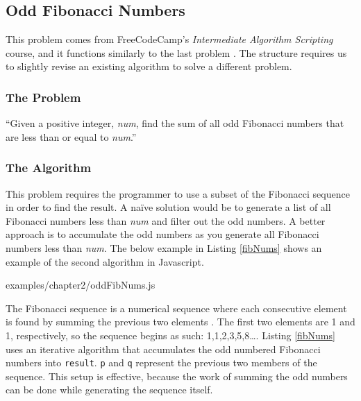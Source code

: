 \documentclass[12pt, oneside, a4paper]{book}
\begin{document}
         \subsection{Odd Fibonacci Numbers}
         This problem comes from FreeCodeCamp's \textit{Intermediate Algorithm Scripting} course, and it functions similarly to the last problem \autocite{freecodecampLearnIntermediateAlgorithm}.
         The structure requires us to slightly revise an existing algorithm to solve a different problem.

         \subsubsection{The Problem}
         ``Given a positive integer, \textit{num}, find the sum of all odd Fibonacci numbers that are less than or equal to \textit{num}.''

         \subsubsection{The Algorithm}
         This problem requires the programmer to use a subset of the Fibonacci sequence in order to find the result.
         A naïve solution would be to generate a list of all Fibonacci numbers less than \textit{num} and filter out the odd numbers.
         A better approach is to accumulate the odd numbers as you generate all Fibonacci numbers less than \textit{num}.
         The below example in Listing \ref{fibNums} shows an example of the second algorithm in Javascript.

         
         {examples/chapter2/oddFibNums.js}

         The Fibonacci sequence is a numerical sequence where each consecutive element is found by summing the previous two elements \autocite{parshallFibonacciSequence}.
         The first two elements are 1 and 1, respectively, so the sequence begins as such: 1,1,2,3,5,8\ldots.
         Listing \ref{fibNums} uses an iterative algorithm that accumulates the odd numbered Fibonacci numbers into \lstinline!result!.
         \lstinline!p! and \lstinline!q! represent the previous two members of the sequence.
         This setup is effective, because the work of summing the odd numbers can be done while generating the sequence itself.
\end{document}
